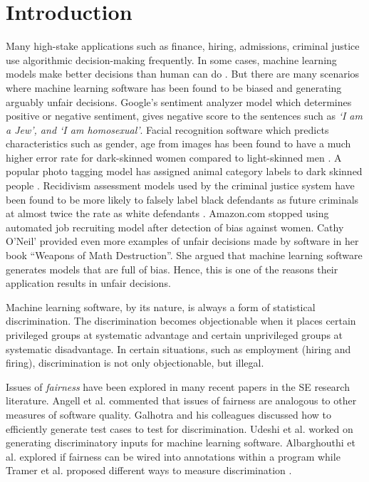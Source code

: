 \documentclass[10pt,conference,review]{IEEEtran}
\begin{document}
\section{Introduction}
Many high-stake applications such as finance, hiring, admissions, criminal justice use algorithmic decision-making frequently. In some cases, machine learning models make better decisions than human can do \cite{Brun:2018:SF:3236024.3264838,Aydemir:2018:RES:3194770.3194778}. But there are many scenarios where machine learning software has been found to be biased and generating arguably unfair decisions. Google's sentiment analyzer model which determines positive or negative sentiment, gives negative score to the sentences such as \textit{`I am a Jew', and `I am homosexual'}\cite{Google_Sentiment}. Facial recognition software which predicts characteristics such as gender, age from images has been found to have a much higher error rate for dark-skinned women compared to light-skinned men \cite{Gender_Bias}. A popular photo tagging model has assigned animal category labels to dark skinned people \cite{Google_Photo}. Recidivism assessment models used by the criminal justice system have been found to be more likely to falsely label black defendants as future criminals at almost twice the rate as white defendants \cite{Machine_Bias}. Amazon.com stopped using automated job recruiting model after detection of bias against women\cite{Amazon_Bias}. Cathy O'Neil’ provided even more examples of unfair decisions made by software in her book ``Weapons of Math Destruction''\cite{O'Neil:2016:WMD:3002861}. She argued that machine learning software generates models that are full of bias. Hence, this is one of the reasons their application results in unfair decisions.


Machine learning software, by its nature, is always a form of statistical discrimination. The discrimination becomes objectionable when it places certain privileged groups at systematic advantage and certain unprivileged groups at systematic disadvantage. In certain situations, such as employment (hiring and firing), discrimination is not only objectionable, but illegal.


Issues of \textit{fairness} have been explored in many  recent papers in the SE research literature. Angell et al. \cite{Angell:2018:TAT:3236024.3264590}  commented that issues of fairness are analogous to other measures of software quality. Galhotra and his colleagues discussed how to efficiently generate test cases to test for discrimination\cite{Galhotra_2017}. Udeshi et al. \cite{Udeshi_2018} worked on generating discriminatory  inputs for machine learning software. Albarghouthi et al. \cite{Albarghouthi:2019:FP:3287560.3287588} explored if fairness can be wired into annotations within a program while Tramer et al. proposed different ways to measure discrimination \cite{Tramer_2017}.
\end{document}
